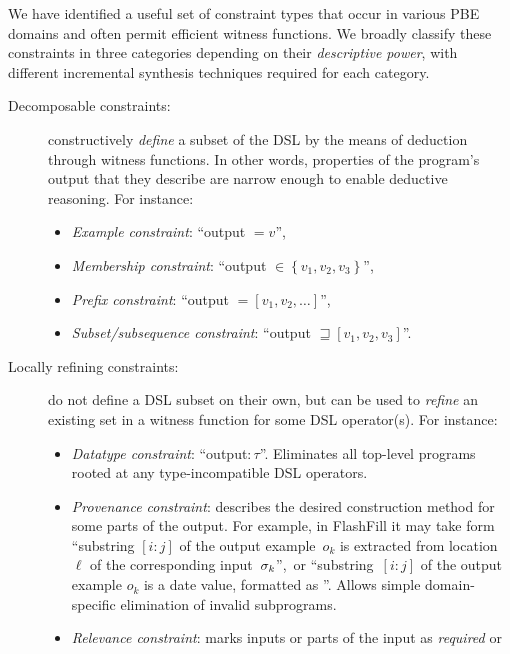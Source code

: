 We have identified a useful set of constraint types that occur in various PBE domains and often permit efficient witness
functions.
We broadly classify these constraints in three categories depending on their \emph{descriptive power}, with different
incremental synthesis techniques required for each category.
\begin{description}
    \item[Decomposable constraints:] constructively \emph{define} a subset of the DSL by the means of
        deduction through witness functions.
        In other words, properties of the program's output that they describe are narrow enough to enable deductive
        reasoning.
        For instance:
        \begin{itemize}[nosep]
            \item \emph{Example constraint}: ``output $= v$'',
            \item \emph{Membership constraint}: ``output $\in \left\{v_1, v_2, v_3\right\}$'',
            \item \emph{Prefix constraint}: ``output $= [v_1, v_2, \dots]$'',
            \item \emph{Subset/subsequence constraint}: ``output $\sqsupseteq [v_1, v_2, v_3]$''.
        \end{itemize}
    \item[Locally refining constraints:] do not define a DSL subset on their own, but can be used to
        \emph{refine} an existing set in a witness function for some DSL operator(s).
        For instance:
        \begin{itemize}[nosep]
            \item \emph{Datatype constraint}: ``output$\colon \tau$''.
                Eliminates all top-level programs rooted at any type-incompatible DSL operators.
            \item \emph{Provenance constraint}: describes the desired construction method for some parts of the output.
                For example, in FlashFill it may take form ``substring $[i:j]$ of the output example~$o_k$ is extracted
                from location $\ell$ of
                the corresponding input~$\sigma_k$'',~or ``substring~$[i:j]$ of the output example $o_k$ is a date
                value, formatted as
                ''.
                Allows simple domain-specific elimination of invalid subprograms.
            \item \emph{Relevance constraint}: marks inputs or parts of the input as \emph{required} or

\end{itemize}
\end{description}
